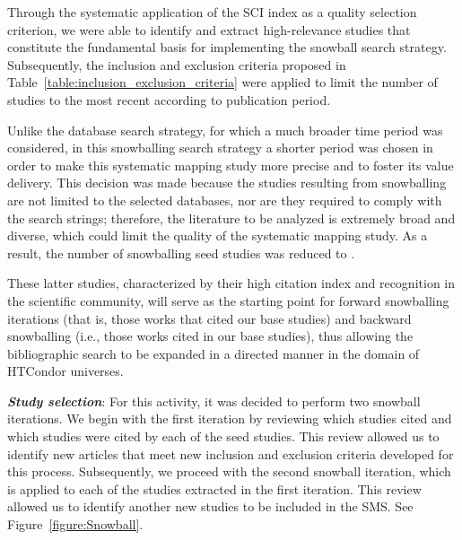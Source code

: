 Through the systematic application of the SCI index as a quality selection criterion, we were able to identify and extract \csiSelected{} high-relevance studies that constitute the fundamental basis for implementing the snowball search strategy. Subsequently, the inclusion and exclusion criteria proposed in Table~\ref{table:inclusion_exclusion_criteria} were applied to limit the number of studies to the most recent according to publication period.

Unlike the database search strategy, for which a much broader time period was considered, in this snowballing search strategy a shorter period was chosen in order to make this systematic mapping study more precise and to foster its value delivery. This decision was made because the studies resulting from snowballing are not limited to the selected databases, nor are they required to comply with the search strings; therefore, the literature to be analyzed is extremely broad and diverse, which could limit the quality of the systematic mapping study. As a result, the number of snowballing seed studies was reduced to \newSnowballStudies{}.

These latter studies, characterized by their high citation index and recognition in the scientific community, will serve as the starting point for forward snowballing iterations (that is, those works that cited our base studies) and backward snowballing (i.e., those works cited in our base studies), thus allowing the bibliographic search to be expanded in a directed manner in the domain of HTCondor universes.

\textit{\textbf{Study selection}}: For this activity, it was decided to perform two snowball iterations. We begin with the first iteration by reviewing which studies cited and which studies were cited by each of the \newSnowballStudies{} seed studies. This review allowed us to identify \firstSnowballIterationStudies{} new articles that meet new inclusion and exclusion criteria developed for this process. Subsequently, we proceed with the second snowball iteration, which is applied to each of the \firstSnowballIterationStudies{} studies extracted in the first iteration. This review allowed us to identify another \secondSnowballIterationStudies{} new studies to be included in the SMS. See Figure~\ref{figure:Snowball}.\\

